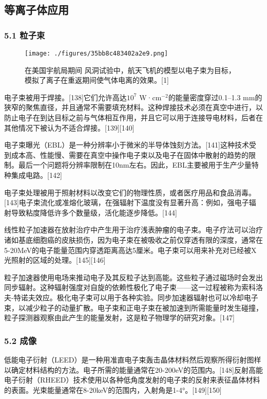 \subsection{等离子体应用}
\subsubsection{5.1 粒子束}
\begin{figure}[ht]
\centering
\texttt{[image: ./figures/35bb8c483402a2e9.png]}
\caption{在美国宇航局期间 风洞试验中，航天飞机的模型以电子束为目标，模拟了离子在重返期间使气体电离的效果。[1]} \label{fig_DZ_16}
\end{figure}
电子束被用于焊接。[138]它们允许高达$10^7$ W·cm$^{-2}$的能量密度穿过0.1–1.3 mm的狭窄的聚焦直径，并且通常不需要填充材料。这种焊接技术必须在真空中进行，以防止电子在到达目标之前与气体相互作用，并且它可以用于连接导电材料，后者在其他情况下被认为不适合焊接。[139][140]

电子束曝光（EBL）是一种分辨率小于微米的半导体蚀刻方法。[141]这种技术受到成本高、性能慢、需要在真空中操作电子束以及电子在固体中散射的趋势的限制。最后一个问题将分辨率限制在10nm左右。因此，EBL主要被用于生产少量特种集成电路。[142]

电子束处理被用于照射材料以改变它们的物理性质，或者医疗用品和食品消毒。[143]电子束流化或准熔化玻璃，在强辐射下温度没有显著升高：例如，强电子辐射导致粘度降低许多个数量级，活化能逐步降低。[144]

线性粒子加速器在放射治疗中产生用于治疗浅表肿瘤的电子束。电子疗法可以治疗诸如基底细胞癌的皮肤损伤，因为电子束在被吸收之前仅穿透有限的深度，通常在5-20MeV的电子能量范围内穿透距离高达5厘米。电子束可以用来补充对已经被X光照射的区域的处理。[145][146]

粒子加速器使用电场来推动电子及其反粒子达到高能。这些粒子通过磁场时会发出同步辐射。这种辐射强度对自旋的依赖性极化了电子束——这一过程被称为索科洛夫-特诺夫效应。极化电子束可以用于各种实验。同步加速器辐射也可以冷却电子束，以减少粒子的动量扩散。电子束和正电子束在被加速到所需能量时发生碰撞，粒子探测器观察由此产生的能量发射，这是粒子物理学的研究对象。[147]
\subsubsection{5.2 成像}
低能电子衍射（LEED）是一种用准直电子束轰击晶体材料然后观察所得衍射图样以确定材料结构的方法。电子所需的能量通常在20-200eV的范围内。[148]反射高能电子衍射（RHEED）技术使用以各种低角度发射的电子束的反射来表征晶体材料的表面。光束能量通常在8-20keV的范围内，入射角是1-4°。[149][150]

